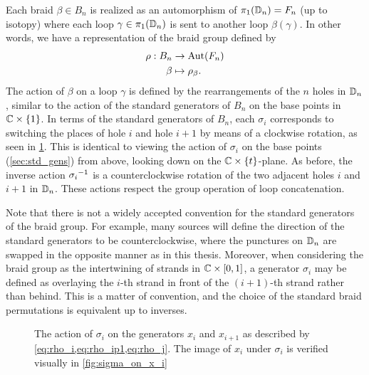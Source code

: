 Each braid $\beta\in B_n$ is realized as an automorphism of $\pi_1(\mathbb{D}_n) = F_n$ (up to isotopy) where each loop $\gamma\in\pi_1(\mathbb{D}_n)$ is sent to another loop $\beta(\gamma)$. In other words, we have a representation of the braid group defined by
\begin{align}
    \rho: B_n &\to \textrm{Aut}\!\left( F_n \right) \\
    \beta &\mapsto \rho_\beta.
\end{align}
The action of $\beta$ on a loop $\gamma$ is defined by the rearrangements of the $n$ holes in $\mathbb{D}_n$, similar to the action of the standard generators of $B_n$ on the base points in $\mathbb{C}\times\left\{ 1 \right\}$. In terms of the standard generators of $B_n$, each $\sigma_i$ corresponds to switching the places of hole $i$ and hole $i+1$ by means of a clockwise rotation, as seen in \cref{fig:sigma_on_Dn}. This is identical to viewing the action of $\sigma_i$ on the base points (\cref{sec:std_gens}) from above, looking down on the $\mathbb{C}\times\left\{ t \right\}$-plane. As before, the inverse action ${ \sigma_i }^{-1}$ is a counterclockwise rotation of the two adjacent holes $i$ and $i+1$ in $\mathbb{D}_n$. These actions respect the group operation of loop concatenation.

Note that there is not a widely accepted convention for the standard generators of the braid group. For example, many sources will define the direction of the standard generators to be counterclockwise, where the punctures on $\mathbb{D}_n$ are swapped in the opposite manner as in this thesis. Moreover, when considering the braid group as the intertwining of strands in $\mathbb{C}\times \left[ 0,1 \right]$, a generator $\sigma_i$ may be defined as overlaying the $i$-th strand in front of the $(i+1)$-th strand rather than behind. This is a matter of convention, and the choice of the standard braid permutations is equivalent up to inverses.


\begin{figure}[htbp]
    \centering
    
    \caption{The action of $\sigma_i$ on the generators $x_i$ and $x_{i+1}$ as described by \cref{eq:rho_i,eq:rho_ip1,eq:rho_j}. The image of $x_i$ under $\sigma_i$ is verified visually in \cref{fig:sigma_on_x_i}}\label{fig:sigma_on_Dn}
\end{figure}

